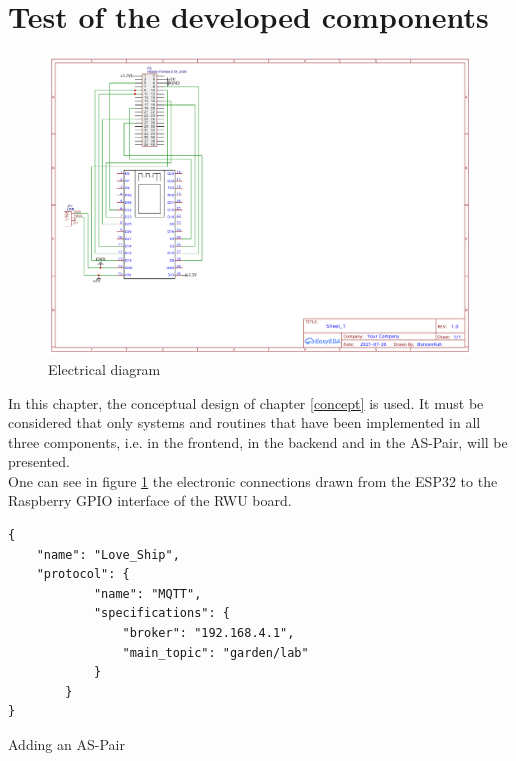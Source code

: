 \section{Test of the developed components}

\begin{figure}
    \vspace{-\baselineskip}
    \centering
     \begin{minipage}[b]{0.39\textwidth}
         \centering
         \includegraphics[width=\textwidth]{images/4_2/schmatic_project.pdf}
         \caption{Electrical diagram}
         \label{fig:schem_electronics}
     \end{minipage}
     \vspace{-.25\baselineskip}
\end{figure}

In this chapter, the conceptual design of chapter \ref{concept} is used. It must be considered that only systems and routines that have been implemented in all three components, i.e. in the frontend, in the backend and in the AS-Pair, will be presented.\\

One can see in figure \ref{fig:schem_electronics} the electronic connections drawn from the ESP32 to the Raspberry GPIO interface of the RWU board.\\

\vspace{4cm}

\begin{listing}[H]
    \begin{verbatim}
{
    "name": "Love_Ship",
    "protocol": {
			"name": "MQTT",
			"specifications": {
				"broker": "192.168.4.1",
				"main_topic": "garden/lab"
			}
		}
}
    \end{verbatim}
    \vspace{-4mm}
    \caption{Adding an AS-Pair} 
    \label{list:adding_pair}
\end{listing}